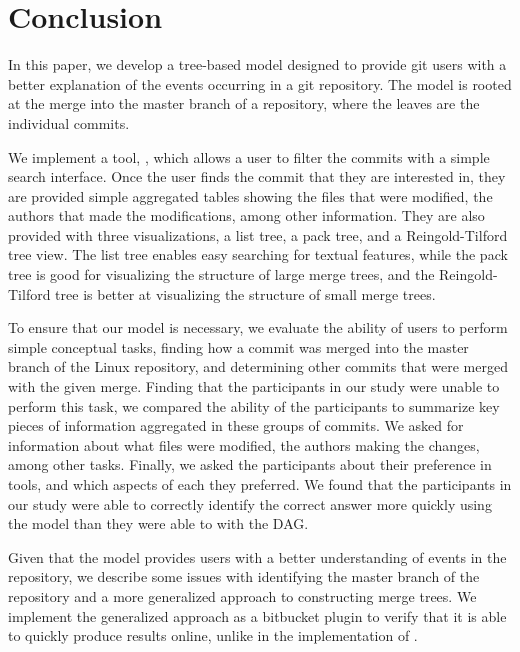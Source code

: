 \documentclass[draft]{IEEEtran}
\begin{document}
\section{Conclusion}
\label{sec:conclusion}

In this paper, we develop a tree-based model designed to provide git
users with a better explanation of the events occurring in a git
repository. The \mt model is rooted at the merge into the master branch
of a repository, where the leaves are the individual commits.

We implement a tool, \tool, which allows a user to filter the commits
with a simple search interface. Once the user finds the commit that they
are interested in, they are provided simple aggregated tables showing
the files that were modified, the authors that made the modifications,
among other information. They are also provided with three
visualizations, a list tree, a pack tree, and a Reingold-Tilford tree
view. The list tree enables easy searching for textual features, while
the pack tree is good for visualizing the structure of large merge
trees, and the Reingold-Tilford tree is better at visualizing the
structure of small merge trees.

To ensure that our model is necessary, we evaluate the ability of users
to perform simple conceptual tasks, finding how a commit was merged into
the master branch of the Linux repository, and determining other commits
that were merged with the given merge. Finding that the participants in
our study were unable to perform this task, we compared the ability of
the participants to summarize key pieces of information aggregated in
these groups of commits. We asked for information about what files were
modified, the authors making the changes, among other tasks. Finally, we
asked the participants about their preference in tools, and which
aspects of each they preferred. We found that the participants in our
study were able to correctly identify the correct answer more quickly
using the \mt model than they were able to with the DAG.

Given that the model provides users with a better understanding of
events in the repository, we describe some issues with identifying the
master branch of the repository and a more generalized approach to
constructing merge trees. We implement the generalized approach as a
bitbucket plugin to verify that it is able to quickly produce results
online, unlike in the implementation of \tool.




\balance




\end{document}
